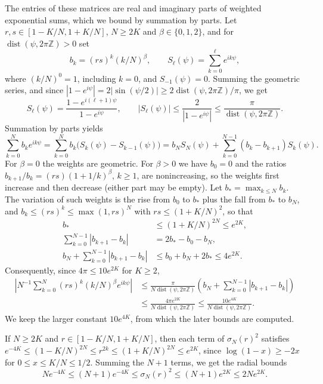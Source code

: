 The entries of these matrices are real and imaginary parts of weighted
exponential sums, which we bound by summation by parts.
Let $r,s\in[1-K/N,1+K/N]$, $N\ge2K$ and $\beta\in\{0,1,2\}$, and for
$\operatorname{dist}(\psi,2\pi\mathbb Z)>0$ set
\[
 b_k=(rs)^k(k/N)^\beta,\qquad S_\ell(\psi)=\sum_{k=0}^\ell e^{ik\psi},
\]
where $(k/N)^0=1$, including $k=0$, and $S_{-1}(\psi)=0$.
Summing the geometric series, and since
$|1-e^{i\psi}|=2|\sin(\psi/2)|\ge2\operatorname{dist}(\psi,2\pi\mathbb Z)/\pi$,
we get
\[
 S_\ell(\psi)=\frac{1-e^{i(\ell+1)\psi}}{1-e^{i\psi}},\qquad
 |S_\ell(\psi)|\le\frac2{|1-e^{i\psi}|}
 \le\frac\pi{\operatorname{dist}(\psi,2\pi\mathbb Z)}.
\]
Summation by parts yields
\[
 \sum_{k=0}^Nb_ke^{ik\psi}
 =\sum_{k=0}^Nb_k\bigl(S_k(\psi)-S_{k-1}(\psi)\bigr)
 =b_NS_N(\psi)+\sum_{k=0}^{N-1}(b_k-b_{k+1})S_k(\psi).
\]
For $\beta=0$ the weights are geometric. For $\beta>0$ we have $b_0=0$
and the ratios $b_{k+1}/b_k=(rs)(1+1/k)^\beta$, $k\ge1$, are
nonincreasing, so the weights first increase and then decrease (either
part may be empty). Let $b_*=\max_{k\le N}b_k$. The variation of such
weights is the rise from $b_0$ to $b_*$ plus the fall from $b_*$ to
$b_N$, and $b_k\le(rs)^k\le\max(1,rs)^N$ with $rs\le(1+K/N)^2$, so that
\begin{align*}
 b_*&\le(1+K/N)^{2N}\le e^{2K},\\
 \sum_{k=0}^{N-1}|b_{k+1}-b_k|&=2b_*-b_0-b_N,\\
 b_N+\sum_{k=0}^{N-1}|b_{k+1}-b_k|
 &\le b_0+b_N+2b_*\le4e^{2K}.
\end{align*}
Consequently, since $4\pi\le10e^{2K}$ for $K\ge2$,
\begin{equation}
 \begin{aligned}
 \left|N^{-1}\sum_{k=0}^N(rs)^k(k/N)^\beta e^{ik\psi}\right|
 &\le\frac\pi{N\operatorname{dist}(\psi,2\pi\mathbb Z)}
       \left(b_N+\sum_{k=0}^{N-1}|b_{k+1}-b_k|\right)\\
 &\le\frac{4\pi e^{2K}}{N\operatorname{dist}(\psi,2\pi\mathbb Z)}
 \le\frac{10e^{4K}}{N\operatorname{dist}(\psi,2\pi\mathbb Z)}.
 \end{aligned}                                      \label{eq:layer2-abel}
\end{equation}
We keep the larger constant $10e^{4K}$, from which the later bounds are
computed.

If $N\ge2K$ and $r\in[1-K/N,1+K/N]$, then each term of $\sigma_N(r)^2$
satisfies $e^{-4K}\le(1-K/N)^{2N}\le r^{2k}\le(1+K/N)^{2N}\le e^{2K}$,
since $\log(1-x)\ge-2x$ for $0\le x\le K/N\le1/2$. Summing the $N+1$
terms, we get the radial bounds
\begin{equation}
 Ne^{-4K}\le(N+1)e^{-4K}\le\sigma_N(r)^2\le(N+1)e^{2K}\le2Ne^{2K}.
 \label{eq:radial-bounds}
\end{equation}

